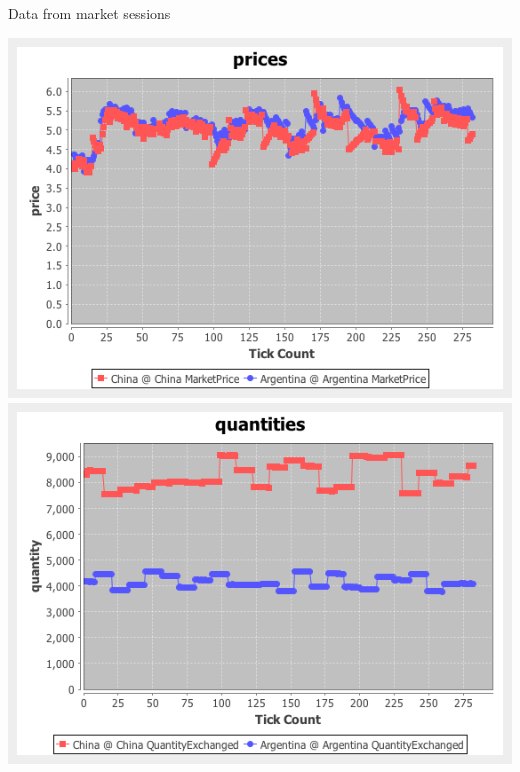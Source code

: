\documentclass{article}
\begin{document}
\noindent Data from market sessions

\vskip2mm
\hskip-2cm
\includegraphics[scale=0.4]{fig_case7_prices}
\includegraphics[scale=0.4]{fig_case7_quantities}
\end{document}
